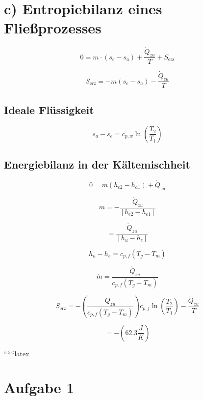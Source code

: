 \section*{c) Entropiebilanz eines Fließprozesses}

\[
0 = m \cdot \left( s_e - s_a \right) + \frac{\dot{Q}_{zu}}{T} + S_{\text{erz}}
\]

\[
S_{\text{erz}} = -m \left( s_e - s_a \right) - \frac{\dot{Q}_{zu}}{T}
\]

\subsection*{Ideale Flüssigkeit}

\[
s_a - s_e = c_{p,w} \ln \left( \frac{T_2}{T_1} \right)
\]

\subsection*{Energiebilanz in der Kältemischheit}

\[
0 = m \left( h_{e2} - h_{a1} \right) + \dot{Q}_{zu}
\]

\[
m = - \frac{\dot{Q}_{zu}}{\left[ h_{e2} - h_{e1} \right]}
\]

\[
= \frac{\dot{Q}_{zu}}{\left[ h_{u} - h_{e} \right]}
\]

\[
h_u - h_e = c_{p,f} \left( T_g - T_m \right)
\]

\[
\dot{m} = \frac{\dot{Q}_{zu}}{c_{p,f} \left( T_g - T_m \right)}
\]

\[
S_{\text{erz}} = - \left( \frac{\dot{Q}_{zu}}{c_{p,f} \left( T_g - T_m \right)} \right) c_{p,f} \ln \left( \frac{T_2}{T_1} \right) - \frac{\dot{Q}_{zu}}{T}
\]

\[
= - \left( 62.3 \frac{J}{K} \right)
\]

``````latex


\section*{Aufgabe 1}